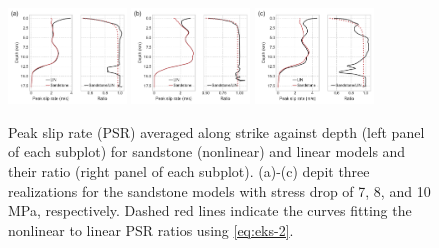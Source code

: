 \clearpage
\begin{figure}[!ht]
    \includegraphics[width=0.28\textwidth]{figures/figure_eks_2a.pdf}\label{fig:eks-2a} \hspace{0.02\textwidth}%
    \includegraphics[width=0.28\textwidth]{figures/figure_eks_2b.pdf}\label{fig:eks-2b} \hspace{0.02\textwidth}%
    \includegraphics[width=0.28\textwidth]{figures/figure_eks_2c.pdf}\label{fig:eks-2c} %
    \caption{Peak slip rate (PSR) averaged along strike against depth (left panel of each subplot) for sandstone (nonlinear) and linear models and their ratio (right panel of each subplot). (a)-(c) depit three realizations for the sandstone models with stress drop of 7, 8, and 10 MPa, respectively. Dashed red lines indicate the curves fitting the nonlinear to linear PSR ratios using \cref{eq:eks-2}.}
    \label{fig:eks-2}
\end{figure}
\clearpage


